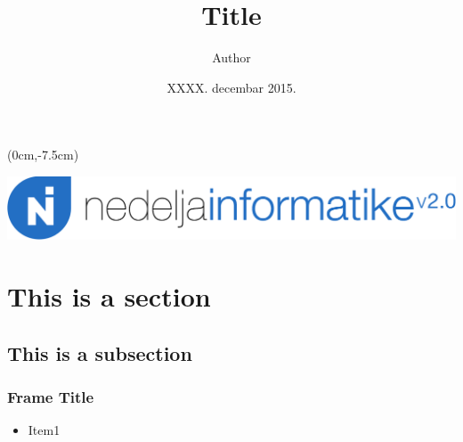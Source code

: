 \documentclass[11pt, compress]{beamer}
\title{Title}
\author[\textcolor{white}{Author}]{Author}
\date{XXXX. decembar 2015.}
\institute{Matematička gimnazija\\ \textcolor{uorange}{\scshape Nedelja informatike v2.0}}
\begin{document}
{
    \begin{frame}
        \titlepage
        \begin{textblock*}{\linewidth}(0cm,-7.5cm)
  		\begin{center}
        \includegraphics[width=0.4\linewidth]{logotype@2x.png}
        \end{center}
        \end{textblock*}
    \end{frame}
}

\section{This is a section}

\subsection{This is a subsection}

\begin{frame}
    \frametitle{Frame Title}
    \begin{itemize}
        \item Item1
    \end{itemize}
\end{frame}
\end{document}
